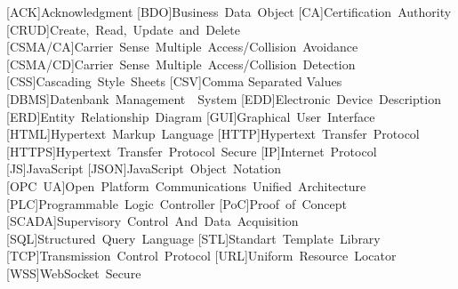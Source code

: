   \begin{acronym}
    [ACK]{Acknowledgment}
    [BDO]{Business Data Object}
    [CA]{Certification Authority}
    [CRUD]{Create, Read, Update and Delete}
    [CSMA/CA]{Carrier Sense Multiple Access/Collision Avoidance}
    [CSMA/CD]{Carrier Sense Multiple Access/Collision Detection}
    [CSS]{Cascading Style Sheets}
    [CSV]{Comma Separated Values}
    [DBMS]{Datenbank Management  System}
    [EDD]{Electronic Device Description}
    [ERD]{Entity Relationship Diagram}
    [GUI]{Graphical User Interface}
    [HTML]{Hypertext Markup Language}
    [HTTP]{Hypertext Transfer Protocol}
    [HTTPS]{Hypertext Transfer Protocol Secure}
    [IP]{Internet Protocol}
    [JS]{JavaScript}
    [JSON]{JavaScript Object Notation}
    [OPC UA]{Open Platform Communications Unified Architecture}
    [PLC]{Programmable Logic Controller}
    [PoC]{Proof of Concept}
    [SCADA]{Supervisory Control And Data Acquisition}
    [SQL]{Structured Query Language}
    [STL]{Standart Template Library}
    [TCP]{Transmission Control Protocol}
    [URL]{Uniform Resource Locator}
    [WSS]{WebSocket Secure}
  \end{acronym}
